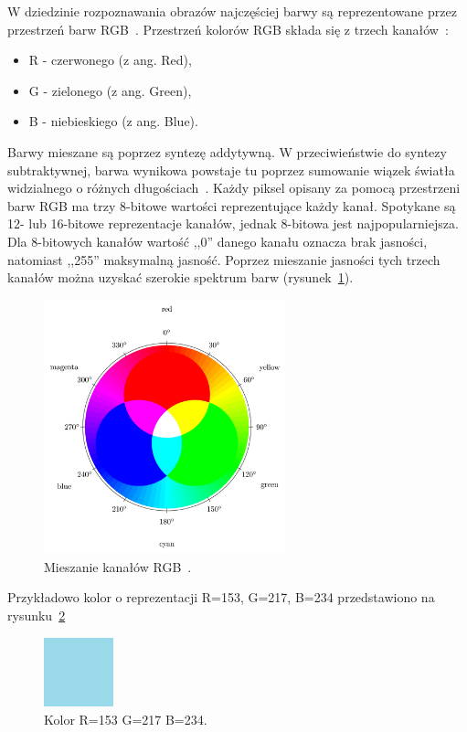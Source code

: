 \documentclass[a4paper,twoside,12pt]{book}
\begin{document}
    W dziedzinie rozpoznawania obrazów najczęściej barwy są reprezentowane przez przestrzeń barw
    RGB~\cite{przestrzenieKolorow}.
    Przestrzeń kolorów RGB składa się z trzech kanałów~\cite{kolory}:
    \begin{itemize}
        \item R - czerwonego (z ang. Red),
        \item G - zielonego (z ang. Green),
        \item B - niebieskiego (z ang. Blue).
    \end{itemize}
    Barwy mieszane są poprzez syntezę addytywną.
    W przeciwieństwie do syntezy subtraktywnej, barwa wynikowa powstaje tu poprzez sumowanie wiązek światła widzialnego o
    różnych długościach~\cite{przestrzenieKolorow}.
    Każdy piksel opisany za pomocą przestrzeni barw RGB ma trzy 8-bitowe wartości reprezentujące każdy kanał.
    Spotykane
    są 12- lub 16-bitowe reprezentacje kanałów, jednak 8-bitowa jest najpopularniejsza.
    Dla 8-bitowych kanałów
    wartość ,,0''
    danego kanału oznacza brak jasności, natomiast ,,255'' maksymalną jasność.
    Poprzez mieszanie jasności tych trzech kanałów
    można uzyskać szerokie spektrum barw (rysunek~\ref{fig.mieszanieKolorow}).

    \begin{figure}[h!]
        \centering
        \includegraphics[width=7cm]{Obrazy/mieszanieKolorow.jpg}
        \caption{Mieszanie kanałów RGB~\cite{colorMixing}.}
        \label{fig.mieszanieKolorow}
    \end{figure}

    Przykładowo kolor o reprezentacji R=153, G=217, B=234 przedstawiono na rysunku~\ref{fig.mieszanieKolorowBlekitny}

    \begin{figure}
        \centering
        \includegraphics[width=2cm]{Obrazy/blekitny.jpg}
        \caption{Kolor R=153 G=217 B=234.}
        \label{fig.mieszanieKolorowBlekitny}
    \end{figure}
\end{document}
